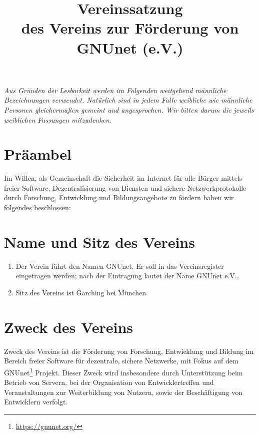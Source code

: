 \documentclass[german,a4paper]{article} %
\title{Vereinssatzung\\des Vereins zur F\"orderung von GNUnet (e.V.)\\}
\date{}
\newenvironment{enumpar}{%
  \renewcommand{\labelenumi}{\theenumi}%
  \renewcommand{\theenumi}{(\arabic{enumi})}%
  \renewcommand{\labelenumii}{\theenumii}%
  \renewcommand{\theenumii}{(\alph{enumii})}%
  \begin{enumerate}}
{\end{enumerate}}
\begin{document}
\maketitle \textit{\small{Aus Gründen der Lesbarkeit werden im
    Folgenden weitgehend männliche Bezeichnungen verwendet. Natürlich
    sind in jedem Falle weibliche wie männliche Personen gleichermaßen
    gemeint und angesprochen. Wir bitten darum die jeweils weiblichen
    Fassungen mitzudenken.}}

\section*{Präambel}
Im Willen, als Gemeinschaft die Sicherheit im Internet f\"ur alle
B\"urger mittels freier Software, Dezentralisierung von Diensten und
sichere Netzwerkprotokolle durch Forschung, Entwicklung und
Bildungsangebote zu f\"ordern haben wir folgendes beschlossen: \par

\section{Name und Sitz des Vereins}
\begin{enumpar}
\item Der Verein führt den Namen \glqq GNUnet\grqq . Er soll in das Vereinsregister eingetragen werden; nach der Eintragung lautet der Name \glqq GNUnet e.V.\grqq.
\item Sitz des Vereins ist Garching bei M\"unchen.
\end{enumpar}

\section{Zweck des Vereins}

Zweck des Vereins ist die F\"orderung von Forschung, Entwicklung und
Bildung im Bereich freier Software f\"ur dezentrale, sichere Netzwerke,
mit Fokus auf dem GNUnet\footnote{\url{https://gnunet.org/}} Projekt.  Dieser
Zweck wird insbesondere durch Unterst\"utzung beim Betrieb
von Servern, bei der Organisation von Entwicklertreffen und
Veranstaltungen zur Weiterbildung von Nutzern, sowie der
Besch\"aftigung von Entwicklern verfolgt.
\end{document}
